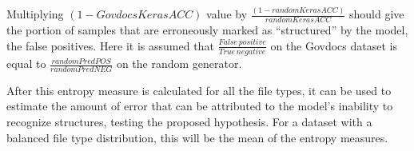 Multiplying $(1-GovdocsKerasACC)$ value by $\frac{(1-randomKerasACC)}{randomKerasACC}$ should give the portion of samples that are erroneously marked as ``structured'' by the model, the false positives. Here it is assumed that $\frac{False\, positive}{True\,negative}$ on the Govdocs dataset is equal to $\frac{randomPredPOS}{randomPredNEG}$ on the random generator.

After this entropy measure is calculated for all the file types, it can be used to estimate the amount of error that can be attributed to the model's inability to recognize structures, testing the proposed hypothesis. For a dataset with a balanced file type distribution, this will be the mean of the entropy measures.
